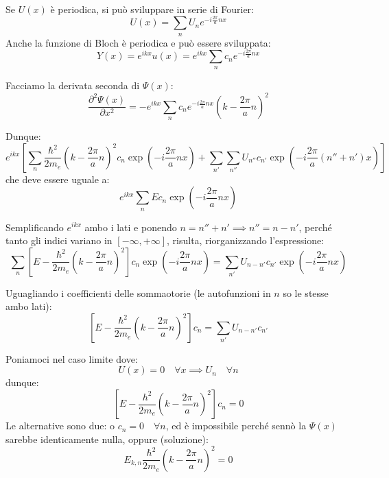 \documentclass{book}
\begin{document}
            \paragraph{}
                Se $U(x)$ è periodica, si può sviluppare in serie di Fourier:
                $$U(x) = \sum_{n} U_{n}e^{-i\frac{2\pi}{a}nx}$$
                Anche la funzione di Bloch è periodica e può essere sviluppata:
                $$Y(x) = e^{ikx}u(x) = e^{ikx} \sum_{n} c_{n}e^{-i \frac{2\pi}{a}nx}$$

                Facciamo la derivata seconda di $\Psi(x)$:
                $$\frac{\partial ^{2} \Psi (x)}{\partial x^{2}} = -e^{ikx} \sum_{n} c_{n}e^{-i\frac{2\pi}{a}nx} (k- \frac{2\pi}{a}n)^{2}$$

                Dunque:
                $$e^{ikx} [\sum_{n} \frac{\hbar ^{2}}{2m_{e}}(k-\frac{2\pi}{a}n)^{2}c_{n}\exp{(-i\frac{2\pi}{a}nx)} + \sum_{n'} \sum_{n''} U_{n''}c_{n'} \exp{(-i\frac{2\pi}{a}(n''+n')x)}]$$
                che deve essere uguale a:
                $$e^{ikx}\sum_{n} Ec_{n} \exp{(-i\frac{2\pi}{a}nx)}$$

                Semplificando $e^{ikx}$ ambo i lati e ponendo $n=n''+n' \implies n''=n-n'$, perché tanto gli indici variano in $[-\infty, +\infty]$, risulta, riorganizzando l'espressione:
                $$\sum_{n} [E - \frac{\hbar ^{2}}{2m_{e}}(k - \frac{2\pi }{a}n)^{2}]c_{n}\exp{(-i\frac{2\pi}{a}nx)} = \sum_{n'}U_{n-n'}c_{n'}\exp{(-i\frac{2\pi}{a}nx)} $$

                Uguagliando i coefficienti delle sommaotorie (le autofunzioni in $n$ so le stesse ambo lati):
                $$[E - \frac{\hbar ^{2}}{2m_{e}}(k - \frac{2\pi }{a}n)^{2}]c_{n}= \sum_{n'}U_{n-n'}c_{n'} $$

                Poniamoci nel caso limite dove: 
                $$U(x) = 0\quad \forall x \implies U_{n} \quad \forall n$$
                dunque:
                $$[E - \frac{h^{2}}{2m_{e}} (k-\frac{2\pi}{a} n )^{2}]c_{n} = 0$$
                Le alternative sono due: o $c_{n} = 0 \quad \forall n$, ed è impossibile perché sennò  la $\Psi(x)$ sarebbe identicamente nulla, oppure (soluzione):
                $$E_{k,n} \frac{\hbar^{2}}{2m_{e}} (k- \frac{2\pi}{a}n)^{2} = 0$$
\end{document}
